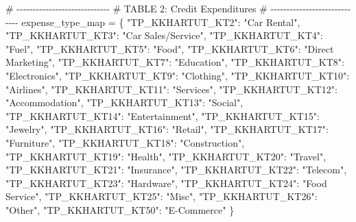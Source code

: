 \documentclass[
  11pt,
  a4paper,
]{article}
\newenvironment{Shaded}{\begin{snugshade}}{\end{snugshade}}
\newcommand{\CommentTok}[1]{\textcolor[rgb]{0.37,0.37,0.37}{#1}}
\newcommand{\NormalTok}[1]{\textcolor[rgb]{0.00,0.23,0.31}{#1}}
\newcommand{\OperatorTok}[1]{\textcolor[rgb]{0.37,0.37,0.37}{#1}}
\newcommand{\StringTok}[1]{\textcolor[rgb]{0.13,0.47,0.30}{#1}}
\begin{document}
\begin{Shaded}
\begin{Highlighting}[]
\CommentTok{\# {-}{-}{-}{-}{-}{-}{-}{-}{-}{-}{-}{-}{-}{-}{-}{-}{-}{-}{-}{-}{-}{-}{-}{-}{-}{-}{-}{-}{-}}
\CommentTok{\# TABLE 2: Credit Expenditures}
\CommentTok{\# {-}{-}{-}{-}{-}{-}{-}{-}{-}{-}{-}{-}{-}{-}{-}{-}{-}{-}{-}{-}{-}{-}{-}{-}{-}{-}{-}{-}{-}}
\NormalTok{expense\_type\_map }\OperatorTok{=}\NormalTok{ \{}
    \StringTok{"TP\_KKHARTUT\_KT2"}\NormalTok{: }\StringTok{"Car Rental"}\NormalTok{,}
    \StringTok{"TP\_KKHARTUT\_KT3"}\NormalTok{: }\StringTok{"Car Sales/Service"}\NormalTok{,}
    \StringTok{"TP\_KKHARTUT\_KT4"}\NormalTok{: }\StringTok{"Fuel"}\NormalTok{,}
    \StringTok{"TP\_KKHARTUT\_KT5"}\NormalTok{: }\StringTok{"Food"}\NormalTok{,}
    \StringTok{"TP\_KKHARTUT\_KT6"}\NormalTok{: }\StringTok{"Direct Marketing"}\NormalTok{,}
    \StringTok{"TP\_KKHARTUT\_KT7"}\NormalTok{: }\StringTok{"Education"}\NormalTok{,}
    \StringTok{"TP\_KKHARTUT\_KT8"}\NormalTok{: }\StringTok{"Electronics"}\NormalTok{,}
    \StringTok{"TP\_KKHARTUT\_KT9"}\NormalTok{: }\StringTok{"Clothing"}\NormalTok{,}
    \StringTok{"TP\_KKHARTUT\_KT10"}\NormalTok{: }\StringTok{"Airlines"}\NormalTok{,}
    \StringTok{"TP\_KKHARTUT\_KT11"}\NormalTok{: }\StringTok{"Services"}\NormalTok{,}
    \StringTok{"TP\_KKHARTUT\_KT12"}\NormalTok{: }\StringTok{"Accommodation"}\NormalTok{,}
    \StringTok{"TP\_KKHARTUT\_KT13"}\NormalTok{: }\StringTok{"Social"}\NormalTok{,}
    \StringTok{"TP\_KKHARTUT\_KT14"}\NormalTok{: }\StringTok{"Entertainment"}\NormalTok{,}
    \StringTok{"TP\_KKHARTUT\_KT15"}\NormalTok{: }\StringTok{"Jewelry"}\NormalTok{,}
    \StringTok{"TP\_KKHARTUT\_KT16"}\NormalTok{: }\StringTok{"Retail"}\NormalTok{,}
    \StringTok{"TP\_KKHARTUT\_KT17"}\NormalTok{: }\StringTok{"Furniture"}\NormalTok{,}
    \StringTok{"TP\_KKHARTUT\_KT18"}\NormalTok{: }\StringTok{"Construction"}\NormalTok{,}
    \StringTok{"TP\_KKHARTUT\_KT19"}\NormalTok{: }\StringTok{"Health"}\NormalTok{,}
    \StringTok{"TP\_KKHARTUT\_KT20"}\NormalTok{: }\StringTok{"Travel"}\NormalTok{,}
    \StringTok{"TP\_KKHARTUT\_KT21"}\NormalTok{: }\StringTok{"Insurance"}\NormalTok{,}
    \StringTok{"TP\_KKHARTUT\_KT22"}\NormalTok{: }\StringTok{"Telecom"}\NormalTok{,}
    \StringTok{"TP\_KKHARTUT\_KT23"}\NormalTok{: }\StringTok{"Hardware"}\NormalTok{,}
    \StringTok{"TP\_KKHARTUT\_KT24"}\NormalTok{: }\StringTok{"Food Service"}\NormalTok{,}
    \StringTok{"TP\_KKHARTUT\_KT25"}\NormalTok{: }\StringTok{"Misc"}\NormalTok{,}
    \StringTok{"TP\_KKHARTUT\_KT26"}\NormalTok{: }\StringTok{"Other"}\NormalTok{,}
    \StringTok{"TP\_KKHARTUT\_KT50"}\NormalTok{: }\StringTok{"E{-}Commerce"}
\NormalTok{\}}


\end{Highlighting}
\end{Shaded}
\end{document}
